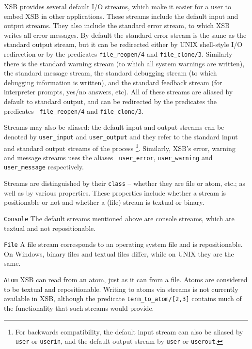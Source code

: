 XSB provides several default I/O streams, which make it easier for a
user to embed XSB in other applications.  These streams include the
default input and output streams.  They also include the standard
error stream, to which XSB writes all error messages.  By default the
standard error stream is the same as the standard output stream, but
it can be redirected either by UNIX shell-style I/O redirection or by
the predicates {\tt file\_reopen/4} and {\tt file\_clone/3}.
Similarly there is the standard warning stream (to which all system
warnings are written), the standard message stream, the standard
debugging stream (to which debugging information is written), and the
standard feedback stream (for interpreter prompts, yes/no answers,
etc).  All of these streams are aliased by default to standard output,
and can be redirected by the predicates the predicates {\tt
  file\_reopen/4} and {\tt file\_clone/3}.


Streams may also be aliased: the default input and output streams can
be denoted by {\tt user\_input} and {\tt user\_output} and they refer
to the standard input and standard output streams of the
process \footnote{For backwards compatibility, the default input
  stream can also be aliased by {\tt user} or {\tt userin}, and the
  default output stream by {\tt user} or {\tt userout}.}.  Similarly,
XSB's error, warning and message streams uses the aliases {\tt
  user\_error}, {\tt user\_warning} and {\tt user\_message}
respectively.

Streams are distinguished by their {\tt class} -- whether they are
file or atom, etc.; as well as by various properties.  These
properties include whether a stream is positionable or not and whether
a (file) stream is textual or binary.

\bi
\item {\tt Console} The default streams mentioned above are
console streams, which are textual and not repositionable.
%
\item {\tt File}  A file stream corresponds to an operating system
file and is repositionable.  On Windows, binary files and textual
files differ, while on UNIX they are the same.  
%
\item {\tt Atom} XSB can read from an atom, just as it can from a file.
Atoms are considered to be textual and repositionable.  Writing to
atoms via streams is not currently available in XSB, although 
the predicate {\tt term\_to\_atom/[2,3]} contains much of the
functionality that such streams would provide.

